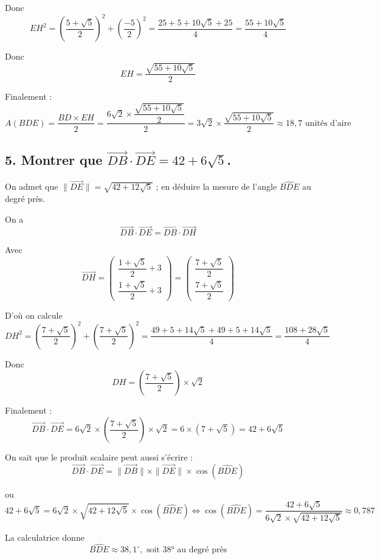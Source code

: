\documentclass[10pt]{article}
\begin{document}
	Donc
	\[
	EH^2 = \left( \dfrac{5 + \sqrt{5}}{2} \right)^2 + \left( \dfrac{-5}{2} \right)^2 = \dfrac{25 + 5 + 10\sqrt{5} + 25}{4} = \dfrac{55 + 10\sqrt{5}}{4}
	\]
	
	Donc
	\[
	EH = \dfrac{\sqrt{55 + 10\sqrt{5}}}{2}
	\]
	
	Finalement :
	\[
	A(BDE) = \dfrac{BD \times EH}{2} = \dfrac{6\sqrt{2} \times \dfrac{\sqrt{55 + 10\sqrt{5}}}{2}}{2} = 3\sqrt{2} \times \dfrac{\sqrt{55 + 10\sqrt{5}}}{2} \approx 18,7 \text{ unités d’aire}
	\]
	
	\subsection*{5. Montrer que $\overrightarrow{DB} \cdot \overrightarrow{DE} = 42 + 6\sqrt{5}$.}
	
	On admet que $\|\overrightarrow{DE}\| = \sqrt{42 + 12\sqrt{5}}$ ; en déduire la mesure de l’angle $\widehat{BDE}$ au degré près.
	
	On a
	\[
	\overrightarrow{DB} \cdot \overrightarrow{DE} = \overrightarrow{DB} \cdot \overrightarrow{DH}
	\]
	
	Avec
	\[
	\overrightarrow{DH} = \begin{pmatrix}
		\dfrac{1 + \sqrt{5}}{2} + 3 \\
		\dfrac{1 + \sqrt{5}}{2} + 3
	\end{pmatrix} = \begin{pmatrix}
		\dfrac{7 + \sqrt{5}}{2} \\
		\dfrac{7 + \sqrt{5}}{2}
	\end{pmatrix}
	\]
	
	D'où on calcule
	\[
	DH^2 = \left( \dfrac{7 + \sqrt{5}}{2} \right)^2 + \left( \dfrac{7 + \sqrt{5}}{2} \right)^2 = \dfrac{49 + 5 + 14\sqrt{5} + 49 + 5 + 14\sqrt{5}}{4} = \dfrac{108 + 28\sqrt{5}}{4}
	\]
	
	Donc
	\[
	DH = \left( \dfrac{7 + \sqrt{5}}{2} \right) \times \sqrt{2}
	\]
	
	Finalement :
	\[
	\overrightarrow{DB} \cdot \overrightarrow{DE} = 6\sqrt{2} \times \left( \dfrac{7 + \sqrt{5}}{2} \right) \times \sqrt{2} = 6 \times (7 + \sqrt{5}) = 42 + 6\sqrt{5}
	\]
	
	On sait que le produit scalaire peut aussi s’écrire :
	\[
	\overrightarrow{DB} \cdot \overrightarrow{DE} = \|\overrightarrow{DB}\| \times \|\overrightarrow{DE}\| \times \cos(\widehat{BDE})
	\]
	
	ou
	\[
	42 + 6\sqrt{5} = 6\sqrt{2} \times \sqrt{42 + 12\sqrt{5}} \times \cos(\widehat{BDE}) \iff \cos(\widehat{BDE}) = \dfrac{42 + 6\sqrt{5}}{6\sqrt{2} \times \sqrt{42 + 12\sqrt{5}}} \approx 0,787
	\]
	
	La calculatrice donne
	\[
	\widehat{BDE} \approx 38,1^\circ, \text{ soit 38° au degré près}
	\]
\end{document}
